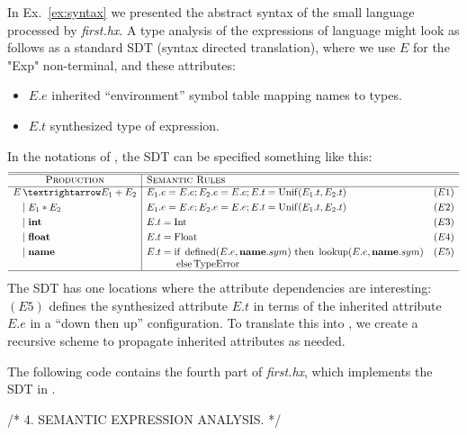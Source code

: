 \documentclass[11pt]{article} %
\begin{document}
\begin{example}\label{ex:analysis}
  In Ex.~\ref{ex:syntax} we presented the abstract syntax of the small language processed by
  \emph{first.hx}. A type analysis of the expressions of language might look as follows as a
  standard SDT (syntax directed translation), where we use $E$ for the "Exp" non-terminal, and these attributes:
  \begin{itemize}
  \item $E.e$ inherited ``environment'' symbol table mapping names to types.
  \item $E.t$ synthesized type of expression.
  \end{itemize}
  In the notations of \cite{Aho+:2006}, the SDT can be specified something like this:
  \begin{equation*}
    \begin{array}{r@{\,}l|lr}
      \hline
      \hline
      \multicolumn{2}{c|}{\textsc{Production}}  & \textsc{Semantic Rules} &\\
      \hline
      E &→ E_1 + E_2 & E_1.e=E.e; E_2.e=E.e; E.t = \op{Unif}(E_1.t, E_2.t) &(E1)\\[\jot]
      &\mid E_1 \ast E_2 & E_1.e=E.e; E_2.e=E.e; E.t = \op{Unif}(E_1.t, E_2.t) &(E2)\\[\jot]
      &\mid \textbf{int} & E.t = \op{Int}&(E3)\\[\jot]
      &\mid \textbf{float} & E.t = \op{Float}&(E4)\\[\jot]
      &\mid \textbf{name} & E.t = \text{if}~\op{defined}(E.e,\textbf{name}.sym)~\text{then}~\op{lookup}(E.e,\textbf{name}.sym)&(E5)\\
      && \qquad\quad\text{else} \op{TypeError}\\
      \hline
    \end{array}
  \end{equation*}
  The SDT has one locations where the attribute dependencies are interesting: 
  $(E5)$ defines the synthesized attribute $E.t$ in terms of the inherited attribute $E.e$ in a
  ``down then up'' configuration.  To translate this into \HAX, we create a recursive scheme to
  propagate inherited attributes as needed.

  The following code contains the fourth part of \emph{first.hx}, which implements the SDT in
  \HAX.
\begin{code}[xleftmargin=1.66em,numbers=left]
/* 4. SEMANTIC EXPRESSION ANALYSIS. */


\end{code}
\end{example}
\end{document}
